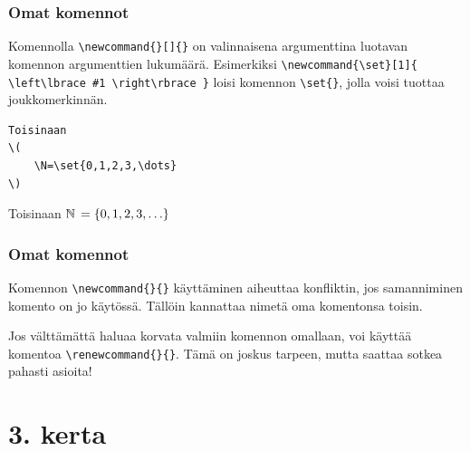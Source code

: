 \begin{frame}[fragile]
    \frametitle{Omat komennot}
    Komennolla \verb-\newcommand{}[]{}- on valinnaisena argumenttina luotavan komennon argumenttien lukumäärä. Esimerkiksi
    \verb-\newcommand{\set}[1]{ \left\lbrace #1 \right\rbrace }- loisi komennon \verb-\set{}-, jolla voisi tuottaa joukkomerkinnän. 
    \vaihto
    \begin{minipage}{4.2cm}
        \begin{scriptsize}
            \begin{Verbatim}[frame=single]
Toisinaan 
\(
    \N=\set{0,1,2,3,\dots}
\)
            \end{Verbatim}
        \end{scriptsize}
    \end{minipage}
    \begin{minipage}{6cm}\selectfont
        Toisinaan 
        \(
        \N=\set{0,1,2,3,\dots}
        \)
    \end{minipage}
\end{frame}
\begin{frame}[fragile]
    \frametitle{Omat komennot}
    Komennon \verb-\newcommand{}{}- käyttäminen aiheuttaa konfliktin, jos samanniminen komento on jo käytössä. Tällöin kannattaa nimetä oma komentonsa toisin. 
    \vaihto
    \begin{extra}
        Jos välttämättä haluaa korvata valmiin komennon omallaan, voi käyttää komentoa \verb-\renewcommand{}{}-. Tämä on joskus tarpeen, mutta saattaa sotkea pahasti asioita!
    \end{extra}
\end{frame}
\begin{frame}[fragile]
    
\end{frame}

\section{3. kerta}
